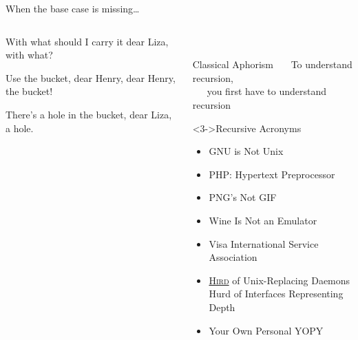 \begin{Coupe}
\begin{frame}{When the base case is missing\ldots}
\begin{columns}
\begin{column}{.55\linewidth}
\begin{block}
{          %
          With what should I carry it dear Liza, with what?
          
          Use the bucket, dear Henry, dear Henry, the \alert{bucket}!
          
          There's a hole in the bucket, dear Liza, a \alert{hole}.}
      \end{block}      
    \end{column}\hspace{-2em}
    \begin{column}{.5\linewidth}
      ~\vspace{2\baselineskip}
      \begin{block}{Classical Aphorism}
        ~~~To understand \alert{recursion},\\
        ~~~you first have to understand \alert{recursion}
      \end{block}

      \begin{block}<3->{Recursive Acronyms}
        \begin{itemize}
        \item \alert{G}NU is \alert{N}ot \alert{U}nix
        \item \alert{P}HP: \alert{H}ypertext \alert{P}reprocessor
        \item \alert{P}NG's \alert{N}ot \alert{G}IF
        \item \alert{W}ine \alert{I}s \alert{N}ot an \alert{E}mulator
        \item {\small\alert{V}isa \alert{I}nternational \alert{S}ervice
            \alert{A}ssociation}
        \item {\small\underline{\alert{H}\textsc{ird}} of
            \alert{U}nix-\alert{R}eplacing \alert{D}aemons\\
            \alert{H}urd of \alert{I}nterfaces \alert{R}epresenting
            \alert{D}epth}
        \item \alert{Y}our \alert{O}wn \alert{P}ersonal \alert{Y}OPY
        \end{itemize}
      \end{block}
    \end{column}
  \end{columns}


\end{frame}
\end{Coupe}
